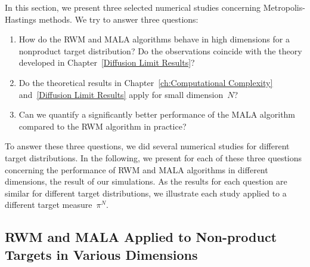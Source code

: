 In this section, we present three selected numerical studies concerning Metropolis-Hastings methods. We try to answer three questions: 
\begin{enumerate}
 \item How do the RWM and MALA algorithms behave in high dimensions for a nonproduct target distribution? Do the observations coincide with the theory developed in Chapter~\ref{Diffusion Limit Results}?
 \item Do the theoretical results in Chapter~\ref{ch:Computational Complexity} and~\ref{Diffusion Limit Results} apply for small dimension~$N$? 
 \item Can we quantify a significantly better performance of the MALA algorithm compared to the RWM algorithm in practice? 
\end{enumerate}

To answer these three questions, we did several numerical studies for different target distributions. In the following, we present for each of these three questions concerning the performance of RWM and MALA algorithms in different dimensions, the result of our simulations. As the results for each question are similar for different target distributions, we illustrate each study applied to a different target measure~$\pi^N$.


\subsection{RWM and MALA Applied to Non-product Targets in Various Dimensions}
\label{sec:sub:Numericals Non-product targets}

